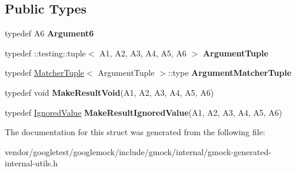 \subsection*{Public Types}
\begin{DoxyCompactItemize}
\item 
typedef A6 {\bfseries Argument6}\hypertarget{structtesting_1_1internal_1_1Function_3_01R_07A1_00_01A2_00_01A3_00_01A4_00_01A5_00_01A6_08_4_ab69a06609b76f3b0ef780b9ecf0a940c}{}\label{structtesting_1_1internal_1_1Function_3_01R_07A1_00_01A2_00_01A3_00_01A4_00_01A5_00_01A6_08_4_ab69a06609b76f3b0ef780b9ecf0a940c}

\item 
typedef \+::testing\+::tuple$<$ A1, A2, A3, A4, A5, A6 $>$ {\bfseries Argument\+Tuple}\hypertarget{structtesting_1_1internal_1_1Function_3_01R_07A1_00_01A2_00_01A3_00_01A4_00_01A5_00_01A6_08_4_a3120b03652156e1475ce5892e1b5dd7a}{}\label{structtesting_1_1internal_1_1Function_3_01R_07A1_00_01A2_00_01A3_00_01A4_00_01A5_00_01A6_08_4_a3120b03652156e1475ce5892e1b5dd7a}

\item 
typedef \hyperlink{structtesting_1_1internal_1_1MatcherTuple}{Matcher\+Tuple}$<$ Argument\+Tuple $>$\+::type {\bfseries Argument\+Matcher\+Tuple}\hypertarget{structtesting_1_1internal_1_1Function_3_01R_07A1_00_01A2_00_01A3_00_01A4_00_01A5_00_01A6_08_4_a8555cb8e68c1e64b91b6c50a7b5951bd}{}\label{structtesting_1_1internal_1_1Function_3_01R_07A1_00_01A2_00_01A3_00_01A4_00_01A5_00_01A6_08_4_a8555cb8e68c1e64b91b6c50a7b5951bd}

\item 
typedef void {\bfseries Make\+Result\+Void}(A1, A2, A3, A4, A5, A6)\hypertarget{structtesting_1_1internal_1_1Function_3_01R_07A1_00_01A2_00_01A3_00_01A4_00_01A5_00_01A6_08_4_aa60c44ec945ca78297aaf7a3c785bce5}{}\label{structtesting_1_1internal_1_1Function_3_01R_07A1_00_01A2_00_01A3_00_01A4_00_01A5_00_01A6_08_4_aa60c44ec945ca78297aaf7a3c785bce5}

\item 
typedef \hyperlink{classtesting_1_1internal_1_1IgnoredValue}{Ignored\+Value} {\bfseries Make\+Result\+Ignored\+Value}(A1, A2, A3, A4, A5, A6)\hypertarget{structtesting_1_1internal_1_1Function_3_01R_07A1_00_01A2_00_01A3_00_01A4_00_01A5_00_01A6_08_4_a20c49ac827433a288921ca0caa0d319b}{}\label{structtesting_1_1internal_1_1Function_3_01R_07A1_00_01A2_00_01A3_00_01A4_00_01A5_00_01A6_08_4_a20c49ac827433a288921ca0caa0d319b}

\end{DoxyCompactItemize}


The documentation for this struct was generated from the following file\+:\begin{DoxyCompactItemize}
\item 
vendor/googletest/googlemock/include/gmock/internal/gmock-\/generated-\/internal-\/utils.\+h\end{DoxyCompactItemize}
